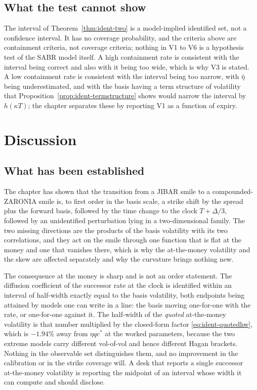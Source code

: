\documentclass[../../../main.tex]{subfiles}
\begin{document}
\subsection{What the test cannot show}

The interval of Theorem~\ref{thm:ident-two} is a model-implied identified set, not a confidence interval. It has no coverage probability, and the criteria above are containment criteria, not coverage criteria; nothing in V1 to V6 is a hypothesis test of the SABR model itself. A high containment rate is consistent with the interval being correct and also with it being too wide, which is why V3 is stated. A low containment rate is consistent with the interval being too narrow, with $\hat\eta$ being underestimated, and with the basis having a term structure of volatility that Proposition~\ref{prop:ident-termstructure} shows would narrow the interval by $h(\kappa T)$; the chapter separates these by reporting V1 as a function of expiry.

\section{Discussion}\label{sec:ident-discussion}

\subsection{What has been established}

The chapter has shown that the transition from a JIBAR smile to a compounded-ZARONIA smile is, to first order in the basis scale, a strike shift by the spread plus the forward basis, followed by the time change to the clock $T+\Delta/3$, followed by an unidentified perturbation lying in a two-dimensional family. The two missing directions are the products of the basis volatility with its two correlations, and they act on the smile through one function that is flat at the money and one that vanishes there, which is why the at-the-money volatility and the skew are affected separately and why the curvature brings nothing new.

The consequence at the money is sharp and is not an order statement. The diffusion coefficient of the successor rate at the clock is identified within an interval of half-width exactly equal to the basis volatility, both endpoints being attained by models one can write in a line: the basis moving one-for-one with the rate, or one-for-one against it. The half-width of the \emph{quoted} at-the-money volatility is that number multiplied by the closed-form factor \eqref{eq:ident-quotedhw}, which is $-1.94\%$ away from $\eta qc^*$ at the worked parameters, because the two extreme models carry different vol-of-vol and hence different Hagan brackets. Nothing in the observable set distinguishes them, and no improvement in the calibration or in the strike coverage will. A desk that reports a single successor at-the-money volatility is reporting the midpoint of an interval whose width it can compute and should disclose.
\end{document}

